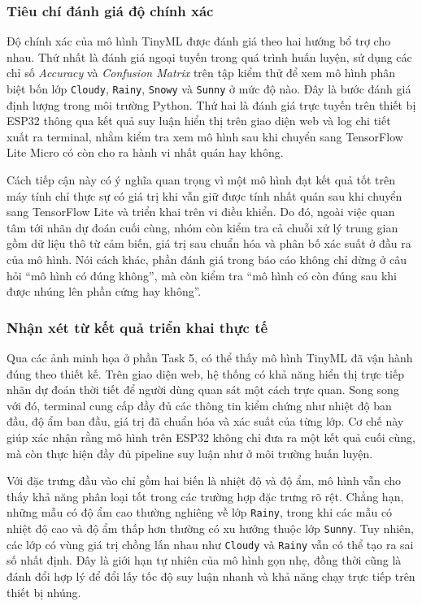 \subsubsection{Tiêu chí đánh giá độ chính xác}
Độ chính xác của mô hình TinyML được đánh giá theo hai hướng bổ trợ cho nhau. Thứ nhất là đánh giá ngoại tuyến trong quá trình huấn luyện, sử dụng các chỉ số \textit{Accuracy} và \textit{Confusion Matrix} trên tập kiểm thử để xem mô hình phân biệt bốn lớp \texttt{Cloudy}, \texttt{Rainy}, \texttt{Snowy} và \texttt{Sunny} ở mức độ nào. Đây là bước đánh giá định lượng trong môi trường Python. Thứ hai là đánh giá trực tuyến trên thiết bị ESP32 thông qua kết quả suy luận hiển thị trên giao diện web và log chi tiết xuất ra terminal, nhằm kiểm tra xem mô hình sau khi chuyển sang TensorFlow Lite Micro có còn cho ra hành vi nhất quán hay không.

Cách tiếp cận này có ý nghĩa quan trọng vì một mô hình đạt kết quả tốt trên máy tính chỉ thực sự có giá trị khi vẫn giữ được tính nhất quán sau khi chuyển sang TensorFlow Lite và triển khai trên vi điều khiển. Do đó, ngoài việc quan tâm tới nhãn dự đoán cuối cùng, nhóm còn kiểm tra cả chuỗi xử lý trung gian gồm dữ liệu thô từ cảm biến, giá trị sau chuẩn hóa và phân bố xác suất ở đầu ra của mô hình. Nói cách khác, phần đánh giá trong báo cáo không chỉ dừng ở câu hỏi “mô hình có đúng không”, mà còn kiểm tra “mô hình có còn đúng sau khi được nhúng lên phần cứng hay không”.

\subsubsection{Nhận xét từ kết quả triển khai thực tế}
Qua các ảnh minh họa ở phần Task 5, có thể thấy mô hình TinyML đã vận hành đúng theo thiết kế. Trên giao diện web, hệ thống có khả năng hiển thị trực tiếp nhãn dự đoán thời tiết để người dùng quan sát một cách trực quan. Song song với đó, terminal cung cấp đầy đủ các thông tin kiểm chứng như nhiệt độ ban đầu, độ ẩm ban đầu, giá trị đã chuẩn hóa và xác suất của từng lớp. Cơ chế này giúp xác nhận rằng mô hình trên ESP32 không chỉ đưa ra một kết quả cuối cùng, mà còn thực hiện đầy đủ pipeline suy luận như ở môi trường huấn luyện.

Với đặc trưng đầu vào chỉ gồm hai biến là nhiệt độ và độ ẩm, mô hình vẫn cho thấy khả năng phân loại tốt trong các trường hợp đặc trưng rõ rệt. Chẳng hạn, những mẫu có độ ẩm cao thường nghiêng về lớp \texttt{Rainy}, trong khi các mẫu có nhiệt độ cao và độ ẩm thấp hơn thường có xu hướng thuộc lớp \texttt{Sunny}. Tuy nhiên, các lớp có vùng giá trị chồng lấn nhau như \texttt{Cloudy} và \texttt{Rainy} vẫn có thể tạo ra sai số nhất định. Đây là giới hạn tự nhiên của mô hình gọn nhẹ, đồng thời cũng là đánh đổi hợp lý để đổi lấy tốc độ suy luận nhanh và khả năng chạy trực tiếp trên thiết bị nhúng.

